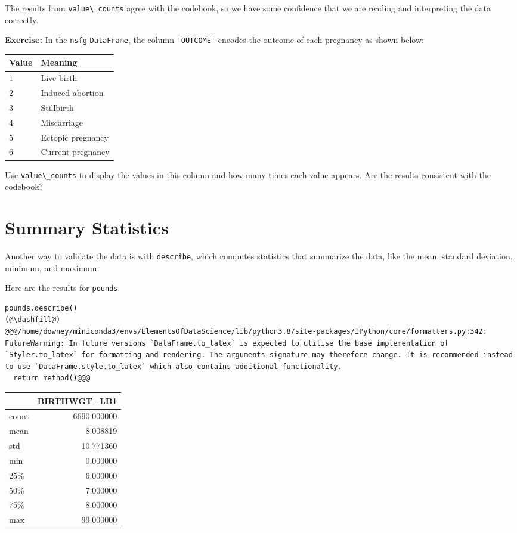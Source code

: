 The results from \passthrough{\lstinline!value\_counts!} agree with the
codebook, so we have some confidence that we are reading and
interpreting the data correctly.

\textbf{Exercise:} In the \passthrough{\lstinline!nsfg!}
\passthrough{\lstinline!DataFrame!}, the column
\passthrough{\lstinline!'OUTCOME'!} encodes the outcome of each
pregnancy as shown below:

\begin{longtable}[]{@{}ll@{}}
\midrule()
Value & Meaning \\
\midrule()
\endhead
1 & Live birth \\
2 & Induced abortion \\
3 & Stillbirth \\
4 & Miscarriage \\
5 & Ectopic pregnancy \\
6 & Current pregnancy \\
\midrule()
\end{longtable}

Use \passthrough{\lstinline!value\_counts!} to display the values in
this column and how many times each value appears. Are the results
consistent with the codebook?

\hypertarget{summary-statistics}{%
\section{Summary Statistics}\label{summary-statistics}}

Another way to validate the data is with
\passthrough{\lstinline!describe!}, which computes statistics that
summarize the data, like the mean, standard deviation, minimum, and
maximum.

Here are the results for \passthrough{\lstinline!pounds!}.

\begin{lstlisting}[]
pounds.describe()
(@\dashfill@)
@@@/home/downey/miniconda3/envs/ElementsOfDataScience/lib/python3.8/site-packages/IPython/core/formatters.py:342: FutureWarning: In future versions `DataFrame.to_latex` is expected to utilise the base implementation of `Styler.to_latex` for formatting and rendering. The arguments signature may therefore change. It is recommended instead to use `DataFrame.style.to_latex` which also contains additional functionality.
  return method()@@@
\end{lstlisting}

\begin{tabular}{lr}
\midrule
{} &  BIRTHWGT\_LB1 \\
\midrule
count &   6690.000000 \\
mean  &      8.008819 \\
std   &     10.771360 \\
min   &      0.000000 \\
25\%   &      6.000000 \\
50\%   &      7.000000 \\
75\%   &      8.000000 \\
max   &     99.000000 \\
\midrule
\end{tabular}

